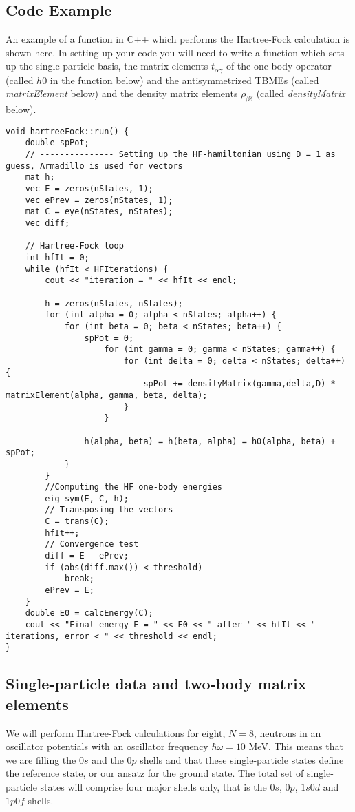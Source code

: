 \documentclass[11pt,a4wide]{article}
\begin{document}
\subsection*{Code Example}
  
An example of a function in C++ which performs the Hartree-Fock calculation is shown here. In setting up your code you will need to write a function which sets up the single-particle basis, the matrix elements $t_{\alpha\gamma}$ of the one-body operator (called $h0$ in the function below) and the antisymmetrized TBMEs (called {\em matrixElement} below) and the density matrix elements $\rho_{\beta\delta}$ (called {\em densityMatrix} below). 

\begin{lstlisting}
void hartreeFock::run() {
    double spPot;
    // --------------- Setting up the HF-hamiltonian using D = 1 as guess, Armadillo is used for vectors
    mat h;
    vec E = zeros(nStates, 1);
    vec ePrev = zeros(nStates, 1);
    mat C = eye(nStates, nStates);
    vec diff;

    // Hartree-Fock loop
    int hfIt = 0;
    while (hfIt < HFIterations) {
        cout << "iteration = " << hfIt << endl;

        h = zeros(nStates, nStates);
        for (int alpha = 0; alpha < nStates; alpha++) {
            for (int beta = 0; beta < nStates; beta++) {
                spPot = 0;
                    for (int gamma = 0; gamma < nStates; gamma++) {
                        for (int delta = 0; delta < nStates; delta++) {
                            spPot += densityMatrix(gamma,delta,D) * matrixElement(alpha, gamma, beta, delta);
                        }
                    }
                
                h(alpha, beta) = h(beta, alpha) = h0(alpha, beta) + spPot;
            }
        }
        //Computing the HF one-body energies
        eig_sym(E, C, h);
        // Transposing the vectors
        C = trans(C);
        hfIt++;
        // Convergence test
        diff = E - ePrev;
        if (abs(diff.max()) < threshold)
            break;
        ePrev = E;
    }
    double E0 = calcEnergy(C);
    cout << "Final energy E = " << E0 << " after " << hfIt << " iterations, error < " << threshold << endl;
}
\end{lstlisting}

\subsection*{Single-particle data and two-body matrix elements}
We will perform Hartree-Fock calculations for eight, $N=8$, neutrons in an oscillator potentials with an oscillator frequency $\hbar\omega =10$ MeV. This means that we are filling the $0s$ and the $0p$ shells and that these single-particle states define the reference state, or our ansatz for the ground state.
The total set of single-particle states will comprise four major shells only, that is the $0s$, $0p$, $1s0d$ and $1p0f$ shells. 
\end{document}
